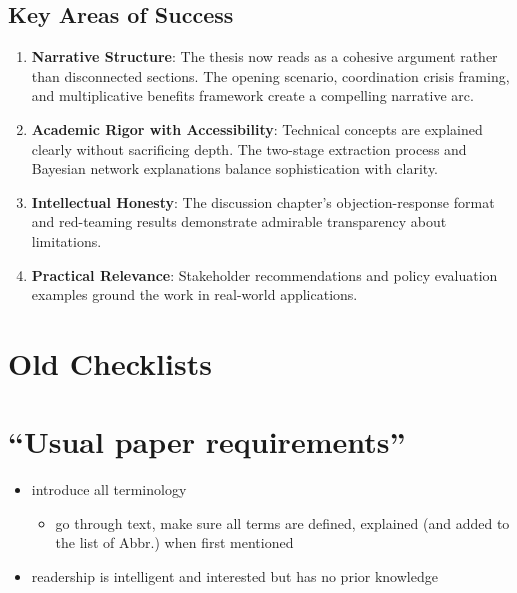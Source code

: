 \documentclass[
  11pt,
  letterpaper,
]{book}
\providecommand{\tightlist}{%
  \setlength{\itemsep}{0pt}\setlength{\parskip}{0pt}}
\begin{document}
\subsection{Key Areas of Success}\label{key-areas-of-success}

\begin{enumerate}
\def\labelenumi{\arabic{enumi}.}
\item
  \textbf{Narrative Structure}: The thesis now reads as a cohesive
  argument rather than disconnected sections. The opening scenario,
  coordination crisis framing, and multiplicative benefits framework
  create a compelling narrative arc.
\item
  \textbf{Academic Rigor with Accessibility}: Technical concepts are
  explained clearly without sacrificing depth. The two-stage extraction
  process and Bayesian network explanations balance sophistication with
  clarity.
\item
  \textbf{Intellectual Honesty}: The discussion chapter's
  objection-response format and red-teaming results demonstrate
  admirable transparency about limitations.
\item
  \textbf{Practical Relevance}: Stakeholder recommendations and policy
  evaluation examples ground the work in real-world applications.
\end{enumerate}

\section{Old Checklists}\label{old-checklists}

\section{``Usual paper requirements''}\label{usual-paper-requirements}

\begin{itemize}
\tightlist
\item
  introduce all terminology

  \begin{itemize}
  \tightlist
  \item
    go through text, make sure all terms are defined, explained (and
    added to the list of Abbr.) when first mentioned\\
  \end{itemize}
\item
  readership is intelligent and interested but has no prior knowledge
\end{itemize}
\end{document}
